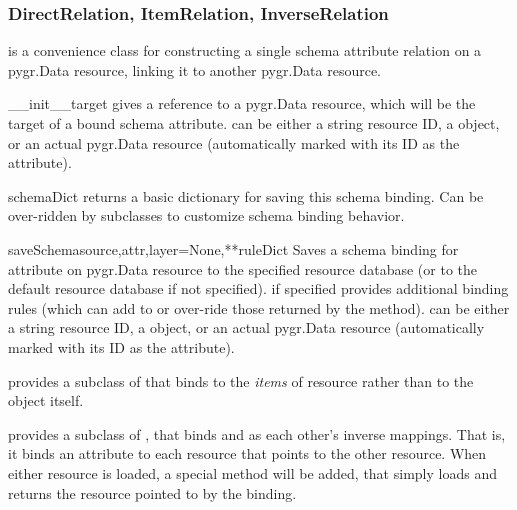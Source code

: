 \documentclass{howto}
\begin{document}
\subsubsection{DirectRelation, ItemRelation, InverseRelation}
 is a convenience class for constructing 
a single schema attribute relation on a pygr.Data resource,
linking it to another pygr.Data resource.
\begin{funcdesc}{__init__}{target}
   gives a reference to a pygr.Data resource, which will
  be the target of a bound schema attribute.   can be either
  a string resource ID, a  object, or
  an actual pygr.Data resource (automatically marked with its ID
  as the  attribute).
\end{funcdesc}

\begin{funcdesc}{schemaDict}{}
  returns a basic  dictionary for saving this schema binding.
  Can be over-ridden by subclasses to customize schema binding behavior.
\end{funcdesc}

\begin{funcdesc}{saveSchema}{source,attr,layer=None,**ruleDict}
  Saves a schema binding for attribute  on pygr.Data resource
   to the specified resource database  (or
  to the default resource database if not specified).  
  if specified provides additional binding rules (which can add to or
  over-ride those returned by the  method).
   can be either
  a string resource ID, a  object, or
  an actual pygr.Data resource (automatically marked with its ID
  as the  attribute).
\end{funcdesc}

 provides a subclass of 
that binds to the {\em items} of resource  rather than to the
 object itself.

 provides a subclass of ,
that binds  and  as each other's inverse mappings.
That is, it binds an  attribute to each resource
that points to the other resource.  When either resource is loaded,
a special  method will be added, that simply
loads and returns the resource pointed to by the 
binding.
\end{document}

